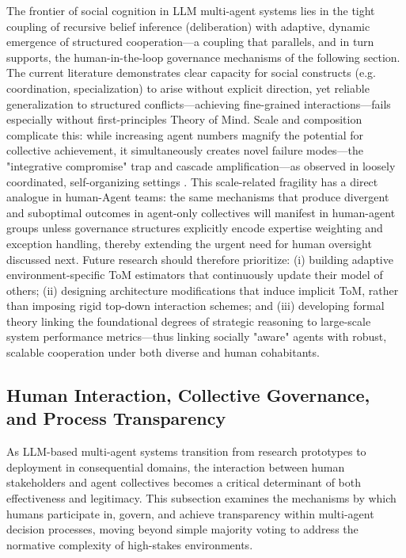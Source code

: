 \documentclass[11pt,a4paper]{article}
\begin{document}
The frontier of social cognition in LLM multi-agent systems lies in the tight coupling of recursive belief inference (deliberation) with adaptive, dynamic emergence of structured cooperation---a coupling that parallels, and in turn supports, the human-in-the-loop governance mechanisms of the following section. The current literature demonstrates clear capacity for social constructs (e.g. coordination, specialization) to arise without explicit direction, yet reliable generalization to structured conflicts---achieving fine-grained interactions---fails especially without first-principles Theory of Mind. Scale and composition complicate this: while increasing agent numbers magnify the potential for collective achievement, it simultaneously creates novel failure modes---the "integrative compromise" trap and cascade amplification---as observed in loosely coordinated, self-organizing settings \cite{arxiv:2602.01011v4,arxiv:1904.08315v1}. This scale-related fragility has a direct analogue in human-Agent teams: the same mechanisms that produce divergent and suboptimal outcomes in agent-only collectives will manifest in human-agent groups unless governance structures explicitly encode expertise weighting and exception handling, thereby extending the urgent need for human oversight discussed next. Future research should therefore prioritize: (i) building adaptive environment-specific ToM estimators that continuously update their model of others; (ii) designing architecture modifications that induce implicit ToM, rather than imposing rigid top-down interaction schemes; and (iii) developing formal theory linking the foundational degrees of strategic reasoning to large-scale system performance metrics---thus linking socially "aware" agents with robust, scalable cooperation under both diverse and human cohabitants.


\subsection{Human Interaction, Collective Governance, and Process Transparency}


As LLM-based multi-agent systems transition from research prototypes to deployment in consequential domains, the interaction between human stakeholders and agent collectives becomes a critical determinant of both effectiveness and legitimacy. This subsection examines the mechanisms by which humans participate in, govern, and achieve transparency within multi-agent decision processes, moving beyond simple majority voting to address the normative complexity of high-stakes environments.
\end{document}
